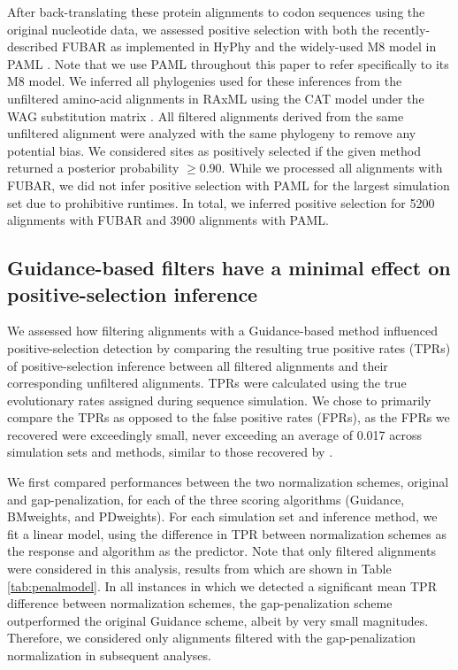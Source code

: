\documentclass[11pt]{article}
\begin{document}
After back-translating these protein alignments to codon sequences using the original nucleotide data, we assessed positive selection with both the recently-described FUBAR \citep{Murrell2013} as implemented in HyPhy \citep{Pond2005} and the widely-used M8 model in PAML \citep{Yang2007}. Note that we use PAML throughout this paper to refer specifically to its M8 model.  We inferred all phylogenies used for these inferences from the unfiltered amino-acid alignments in RAxML \citep{Stamatakis2006} using the CAT model \citep{Stamatakis2006C} under the WAG substitution matrix \citep{Whelan2001}. All filtered alignments derived from the same unfiltered alignment were analyzed with the same phylogeny to remove any potential bias. We considered sites as positively selected if the given method returned a posterior probability $\geq0.90$. While we processed all alignments with FUBAR, we did not infer positive selection with PAML for the largest simulation set due to prohibitive runtimes. In total, we inferred positive selection for 5200 alignments with FUBAR and 3900 alignments with PAML.


\subsection*{Guidance-based filters have a minimal effect on positive-selection inference}

We assessed how filtering alignments with a Guidance-based method influenced positive-selection detection by comparing the resulting true positive rates (TPRs) of positive-selection inference between all filtered alignments and their corresponding unfiltered alignments. TPRs were calculated using the true evolutionary rates assigned during sequence simulation. We chose to primarily compare the TPRs as opposed to the false positive rates (FPRs), as the FPRs we recovered were exceedingly small, never exceeding an average of 0.017 across simulation sets and methods, similar to those recovered by \citet{Jordan2012}. 

We first compared performances between the two normalization schemes, original and gap-penalization, for each of the three scoring algorithms (Guidance, BMweights, and PDweights). For each simulation set and inference method, we fit a linear model, using the difference in TPR between normalization schemes as the response and algorithm as the predictor. Note that only filtered alignments were considered in this analysis, results from which are shown in Table \ref{tab:penalmodel}. In all instances in which we detected a significant mean TPR difference between normalization schemes, the gap-penalization scheme outperformed the original Guidance scheme, albeit by very small magnitudes. Therefore, we considered only alignments filtered with the gap-penalization normalization in subsequent analyses.
\end{document}
